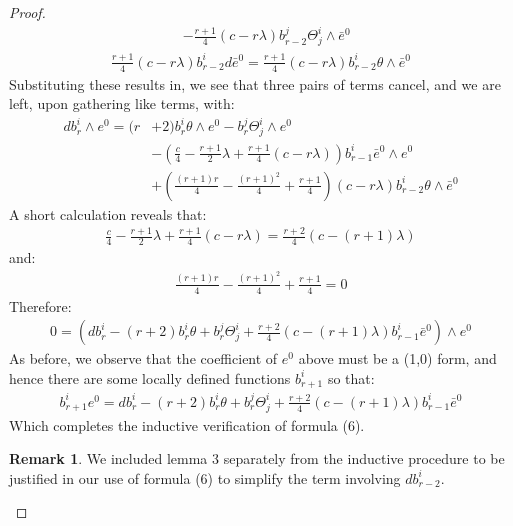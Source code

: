 \documentclass[11pt]{amsart}
\theoremstyle{definition}
\newtheorem{remark}[subsection]{Remark}
\begin{document}
\begin{proof}
\begin{align*}
&- \frac{r+1}{4} (c - r \lambda) b^j_{r-2} \Theta^i_j \wedge \bar{e}^0
\end{align*}
%
\begin{align*}
\frac{r+1}{4} (c - r \lambda) b^i_{r-2} d \bar{e}^0 = \frac{r+1}{4} (c - r \lambda) b^i_{r-2} \theta \wedge \bar{e}^0
\end{align*}
%
Substituting these results in, we see that three pairs of terms cancel, and we are left, upon gathering like terms, with:
%
\begin{align*}
d b^i_r \wedge e^0 = (r &+ 2) b^i_r \theta \wedge e^0 - b^j_r \Theta^i_j \wedge e^0 \\
&- \left( \frac{c}{4} - \frac{r+1}{2} \lambda + \frac{r+1}{4} (c - r \lambda) \right) b^i_{r-1} \bar{e}^0 \wedge e^0 \\
&+ \left( \frac{ (r+1)r }{4} - \frac{ (r+1)^2 }{4} + \frac{r+1}{4} \right) (c - r \lambda) b^i_{r-2} \theta \wedge \bar{e}^0
\end{align*}
%
A short calculation reveals that:
%
\begin{align*}
\frac{c}{4} - \frac{r+1}{2} \lambda + \frac{r+1}{4} (c - r \lambda) = \frac{r+2}{4}(c - (r+1) \lambda)
\end{align*}
%
and:
%
\begin{align*}
\frac{ (r+1)r }{4} - \frac{ (r+1)^2 }{4} + \frac{r+1}{4} = 0
\end{align*}
%
Therefore:
%
\begin{align*}
0 = \left( d b^i_r - (r + 2) b^i_r \theta + b^j_r \Theta^i_j +  \frac{r+2}{4}(c - (r+1) \lambda ) b^i_{r-1} \bar{e}^0 \right) \wedge e^0
\end{align*}
%
As before, we observe that the coefficient of $e^0$ above must be a (1,0) form, and hence there are some locally defined functions $b^i_{r+1}$ so that:
%
\begin{align*}
b^i_{r+1} e^0 = d b^i_r - (r + 2) b^i_r \theta + b^j_r \Theta^i_j +  \frac{r+2}{4}(c - (r+1) \lambda ) b^i_{r-1} \bar{e}^0
\end{align*}
%
Which completes the inductive verification of formula (6).

\begin{remark}  We included lemma 3 separately from the inductive procedure to be justified in our use of formula (6) to simplify the term involving $d b^i_{r-2}$.
\end{remark}
%
\bigskip


\end{proof}
\end{document}
